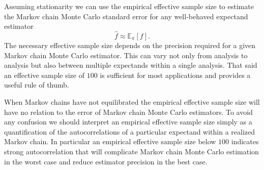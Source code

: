 \documentclass[
  letterpaper,
  DIV=11,
  numbers=noendperiod]{scrartcl}
\begin{document}
Assuming stationarity we can use the empirical effective sample size to
estimate the Markov chain Monte Carlo standard error for any
well-behaved expectand estimator \[
\hat{f} \approx \mathbb{E}_{\pi}[f].
\] The necessary effective sample size depends on the precision required
for a given Markov chain Monte Carlo estimator. This can vary not only
from analysis to analysis but also between multiple expectands within a
single analysis. That said an effective sample size of \(100\) is
sufficient for most applications and provides a useful rule of thumb.

When Markov chains have not equilibrated the empirical effective sample
size will have no relation to the error of Markov chain Monte Carlo
estimators. To avoid any confusion we should interpret an empirical
effective sample size simply as a quantification of the autocorrelations
of a particular expectand within a realized Markov chain. In particular
an empirical effective sample size below \(100\) indicates strong
autocorrelation that will complicate Markov chain Monte Carlo estimation
in the worst case and reduce estimator precision in the best case.
\end{document}
